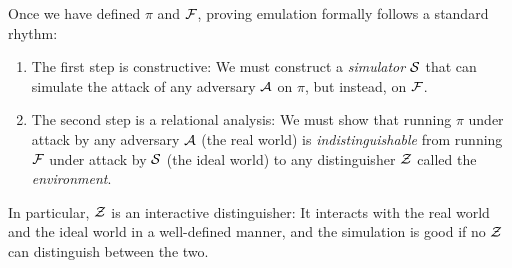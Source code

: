 Once we have defined $\pi$ and $\mathcal{{F}}$, proving emulation formally
follows a standard rhythm:
\begin{enumerate}[leftmargin=*]
\item The first step is constructive: We must construct a \emph{simulator}
  $\mathcal{{S}}$ that can simulate the attack of any adversary $\mathcal{{A}}$ on $\pi$, but
  instead, on $\mathcal{{F}}$.
\item The second step is a relational analysis: We must show that running $\pi$
  under attack by any adversary $\mathcal{{A}}$ (the real world) is
  \emph{indistinguishable} from running $\mathcal{{F}}$ under attack by $\mathcal{{S}}$ (the
  ideal world) to any distinguisher $\mathcal{{Z}}$ called the \emph{environment}.
\end{enumerate}
In particular, $\mathcal{{Z}}$ is an interactive distinguisher: It interacts with the
real world and the ideal world in a well-defined manner, and the simulation is
good if no $\mathcal{{Z}}$ can distinguish between the two.

